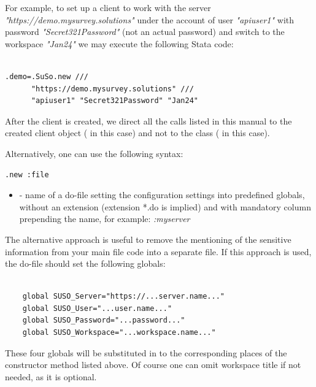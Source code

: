 For example, to set up a client to work with the server \newline
\textit{"https://demo.mysurvey.solutions"}
under the account of user
\textit{"apiuser1"}
with password
\textit{"Secret321Password"}
(not an actual password) and switch to the workspace
\textit{"Jan24"}
we may execute the following Stata code:

\begin{lstlisting}[style=CommandLineStyle, showlines=true]

.demo=.SuSo.new ///
      "https://demo.mysurvey.solutions" ///
      "apiuser1" "Secret321Password" "Jan24"

\end{lstlisting}

After the client is created, we direct all the calls listed in this manual to
the created client object ( in this case) and not to the class
( in this case).

Alternatively, one can use the following syntax:
\begin{lstlisting}[style=CommandLineStyle, showlines=true]
.new :file
\end{lstlisting}

\paramsheader
\begin{itemize}
\item {} - name of a do-file setting the configuration settings into predefined globals, without an extension (extension *.do is implied) and with mandatory column prepending the name, for example: \textquotedbl\textit{:myserver}\textquotedbl
\end{itemize}

The alternative approach is useful to remove the mentioning of the sensitive information from your main file code into a separate file. If this approach is used, the do-file should set the following globals:
\begin{lstlisting}[style=CommandLineStyle, showlines=true]

    global SUSO_Server="https://...server.name..."
    global SUSO_User="...user.name..."
    global SUSO_Password="...password..."
    global SUSO_Workspace="...workspace.name..."

\end{lstlisting}

These four globals will be substituted in to the corresponding places of the constructor method listed above. Of course one can omit workspace title if not needed, as it is optional.

